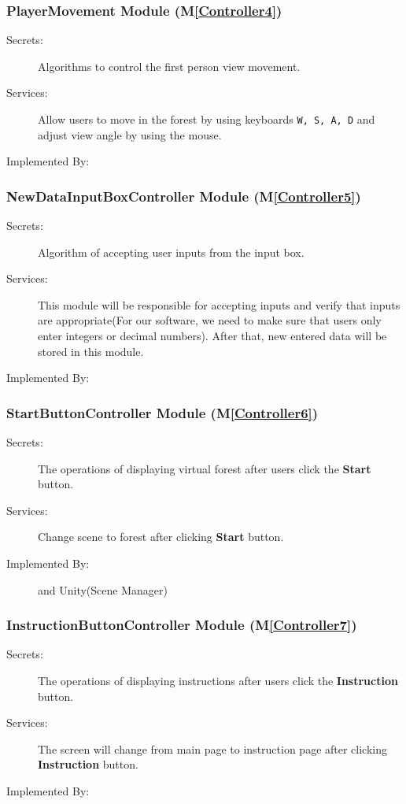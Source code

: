\documentclass[12pt, titlepage]{article}
\newcommand{\mref}[1]{M\ref{#1}}
\begin{document}
\subsubsection{PlayerMovement Module (\mref{Controller4})}
\begin{description}
\item[Secrets:] Algorithms to control the first person view movement.
\item[Services:] Allow users to move in the forest by using keyboards \verb|W, S, A, D| and 
adjust view angle by using the mouse.
\item[Implemented By:] \progname{}
\end{description}

\subsubsection{NewDataInputBoxController Module (\mref{Controller5})}
\begin{description}
\item[Secrets:] Algorithm of accepting user inputs from the input box.
\item[Services:] This module will be responsible for accepting inputs and verify that inputs
are appropriate(For our software, we need to make sure that users only enter integers or
decimal numbers). After that, new entered data will be stored in this module.
\item[Implemented By:] \progname{}
\end{description}

\renewcommand{\bt}{\textbf{Start }}
\subsubsection{StartButtonController Module (\mref{Controller6})}
\begin{description}
\item[Secrets:] The operations of displaying virtual
forest after users click the \bt button.
\item[Services:] Change scene to forest after clicking \bt button.
\item[Implemented By:] \progname{} and Unity(Scene Manager)
\end{description}

\renewcommand{\bt}{\textbf{Instruction }}
\subsubsection{InstructionButtonController Module (\mref{Controller7})}
\begin{description}
\item[Secrets:] The operations of displaying instructions after users click the \bt button.
\item[Services:] The screen will change from main page to instruction page after clicking
 \bt button.
\item[Implemented By:] \progname{}
\end{description}
\end{document}
